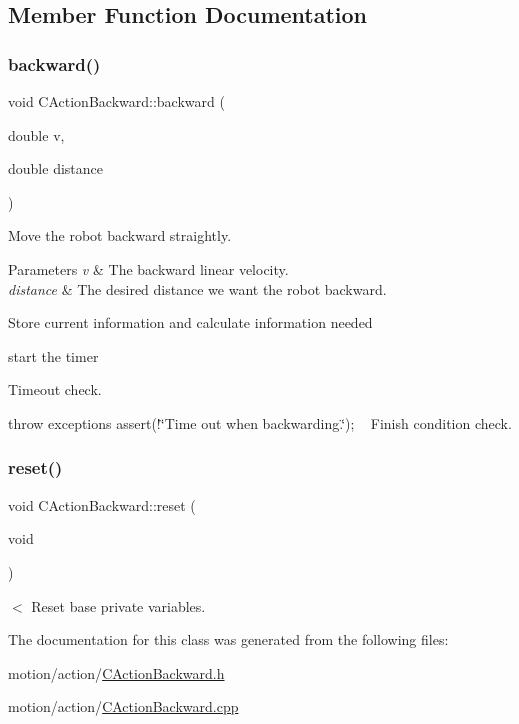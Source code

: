 \subsection{Member Function Documentation}
\mbox{\label{classmotion_1_1CActionBackward_ab05c93abef4815a4a9f38afeddbb8c2a}} 
\subsubsection{\texorpdfstring{backward()}{backward()}}
{\footnotesize\ttfamily void C\+Action\+Backward\+::backward (\begin{DoxyParamCaption}\item[{double}]{v,  }\item[{double}]{distance }\end{DoxyParamCaption})}

Move the robot backward straightly. 
\begin{DoxyParams}{Parameters}
{\em v} & The backward linear velocity. \\
\hline
{\em distance} & The desired distance we want the robot backward. \\
\hline
\end{DoxyParams}
Store current information and calculate information needed

start the timer

Timeout check.

throw exceptions assert(!\char`\"{}\+Time out when backwarding.\char`\"{}); ~\newline
 Finish condition check. \mbox{\label{classmotion_1_1CActionBackward_a609f364c24b4ceebda81c0b591692d2a}} 
\subsubsection{\texorpdfstring{reset()}{reset()}}
{\footnotesize\ttfamily void C\+Action\+Backward\+::reset (\begin{DoxyParamCaption}\item[{void}]{ }\end{DoxyParamCaption})}

$<$ Reset base private variables. 

The documentation for this class was generated from the following files\+:\begin{DoxyCompactItemize}
\item 
motion/action/\mbox{\hyperlink{CActionBackward_8h}{C\+Action\+Backward.\+h}}\item 
motion/action/\mbox{\hyperlink{CActionBackward_8cpp}{C\+Action\+Backward.\+cpp}}\end{DoxyCompactItemize}

